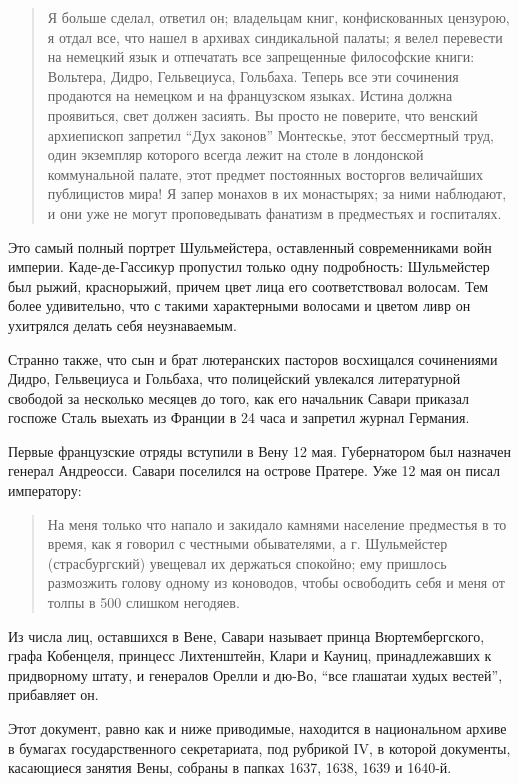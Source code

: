 \documentclass[
  oneside,
  12pt,
  titlepage]{book}
\begin{document}
\begin{quote}
Я больше сделал, ответил он; владельцам книг, конфискованных цензурою, я отдал все, что нашел в архивах синдикальной палаты; я велел перевести на немецкий язык и отпечатать все запрещенные философские книги: Вольтера, Дидро, Гельвециуса, Гольбаха. Теперь все эти сочинения продаются на немецком и на французском языках. Истина должна проявиться, свет должен засиять. Вы просто не поверите, что венский архиепископ запретил ``Дух законов'' Монтескье, этот бессмертный труд, один экземпляр которого всегда лежит на столе в лондонской коммунальной палате, этот предмет постоянных восторгов величайших публицистов мира! Я запер монахов в их монастырях; за ними наблюдают, и они уже не могут проповедывать фанатизм в предместьях и госпиталях.
\end{quote}

Это самый полный портрет Шульмейстера, оставленный современниками войн империи. Каде-де-Гассикур пропустил только одну подробность: Шульмейстер был рыжий, краснорыжий, причем цвет лица его соответствовал волосам. Тем более удивительно, что с такими характерными волосами и цветом ливр он ухитрялся делать себя неузнаваемым.

Странно также, что сын и брат лютеранских пасторов восхищался сочинениями Дидро, Гельвециуса и Гольбаха, что полицейский увлекался литературной свободой за несколько месяцев до того, как его начальник Савари приказал госпоже Сталь выехать из Франции в 24 часа и запретил журнал Германия.

Первые французские отряды вступили в Вену 12 мая. Губернатором был назначен генерал Андреосси. Савари поселился на острове Пратере. Уже 12 мая он писал императору:

\begin{quote}
На меня только что напало и закидало камнями население предместья в то время, как я говорил с честными обывателями, а г. Шульмейстер (страсбургский) увещевал их держаться спокойно; ему пришлось размозжить голову одному из коноводов, чтобы освободить себя и меня от толпы в 500 слишком негодяев.
\end{quote}

Из числа лиц, оставшихся в Вене, Савари называет принца Вюртембергского, графа Кобенцеля, принцесс Лихтенштейн, Клари и Кауниц, принадлежавших к придворному штату, и генералов Орелли и дю-Во, ``все глашатаи худых вестей'', прибавляет он.

Этот документ, равно как и ниже приводимые, находится в национальном архиве в бумагах государственного секретариата, под рубрикой IV, в которой документы, касающиеся занятия Вены, собраны в папках 1637, 1638, 1639 и 1640-й.
\end{document}
